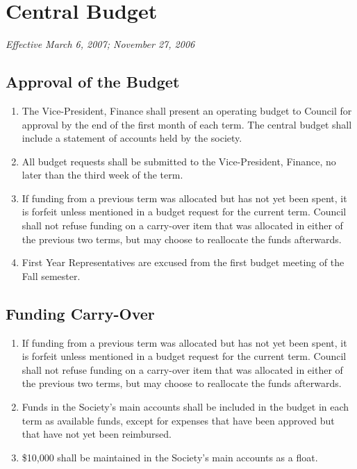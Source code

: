 \section{Central Budget}
\emph{Effective March 6, 2007; November 27, 2006}\\

\subsection{Approval of the Budget}
\begin{enumerate}
    \item The Vice-President, Finance shall present an operating budget to
        Council for approval by the end of the first month of each term. The
        central budget shall include a statement of accounts held by the
        society.
    \item All budget requests shall be submitted to the Vice-President,
        Finance, no later than the third week of the term.
    \item If funding from a previous term was allocated but has not yet been
        spent, it is forfeit unless mentioned in a budget request for the
        current term.  Council shall not refuse funding on a carry-over item
        that was allocated in either of the previous two terms, but may choose
        to reallocate the funds afterwards.
    \item First Year Representatives are excused from the first budget meeting
        of the Fall semester.
\end{enumerate}

\subsection{Funding Carry-Over}
\begin{enumerate}
    \item If funding from a previous term was allocated but has not yet been
        spent, it is forfeit unless mentioned in a budget request for the
        current term. Council shall not refuse funding on a carry-over item
        that was allocated in either of the previous two terms, but may choose
        to reallocate the funds afterwards.
    \item Funds in the Society's main accounts shall be included in the budget
        in each term as available funds, except for expenses that have been
        approved but that have not yet been reimbursed.
    \item \$10,000 shall be maintained in the Society's main accounts as a
        float.
\end{enumerate}

